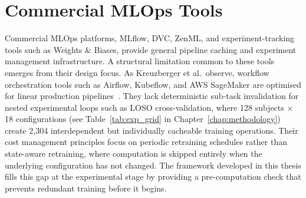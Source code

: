 \section{Commercial MLOps Tools}
\label{sec:related_commercial}
Commercial MLOps platforms, MLflow, DVC, ZenML, and experiment-tracking tools
such as Weights \& Biases, provide general pipeline caching and experiment
management infrastructure. A structural limitation common to these tools
emerges from their design focus. As Kreuzberger et al.\ observe, workflow
orchestration tools such as Airflow, Kubeflow, and AWS SageMaker are optimised
for linear production pipelines~\cite{kreuzberger2023mlops}. They lack
deterministic sub-task invalidation for nested experimental loops such as LOSO
cross-validation, where 128 subjects $\times$ 18 configurations
(see Table~\ref{tab:exp_grid} in Chapter~\ref{chap:methodology}) create
2{,}304 interdependent but individually cacheable training operations.
Their cost management principles focus on periodic retraining schedules rather
than state-aware retraining, where computation is skipped entirely when the
underlying configuration has not changed. The framework developed in this
thesis fills this gap at the experimental stage by providing a pre-computation
check that prevents redundant training before it begins.

